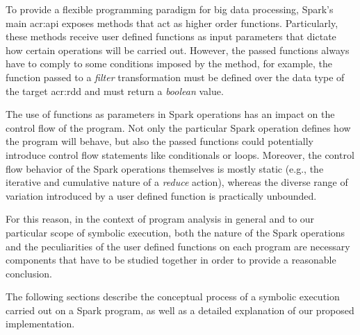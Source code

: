 \label{ch:symbolic-spark}

To provide a flexible programming paradigm for big data processing, Spark's main \acrshort{acr:api} exposes methods that act as higher order functions. Particularly, these methods receive user defined functions as input parameters that dictate how certain operations will be carried out. However, the passed functions always have to comply to some conditions imposed by the method, for example, the function passed to a \textit{filter} transformation must be defined over the data type of the target \acrshort{acr:rdd} and must return a \textit{boolean} value.

The use of functions as parameters in Spark operations has an impact on the control flow of the program. Not only the particular Spark operation defines how the program will behave, but also the passed functions could potentially introduce control flow statements like conditionals or loops. Moreover, the control flow behavior of the Spark operations themselves is mostly static (e.g., the iterative and cumulative nature of a \textit{reduce} action), whereas the diverse range of variation introduced by a user defined function is practically unbounded.

For this reason, in the context of program analysis in general and to our particular scope of symbolic execution, both the nature of the Spark operations and the peculiarities of the user defined functions on each program are necessary components that have to be studied together in order to provide a reasonable conclusion.

The following sections describe the conceptual process of a symbolic execution carried out on a Spark program, as well as a detailed explanation of our proposed implementation.




